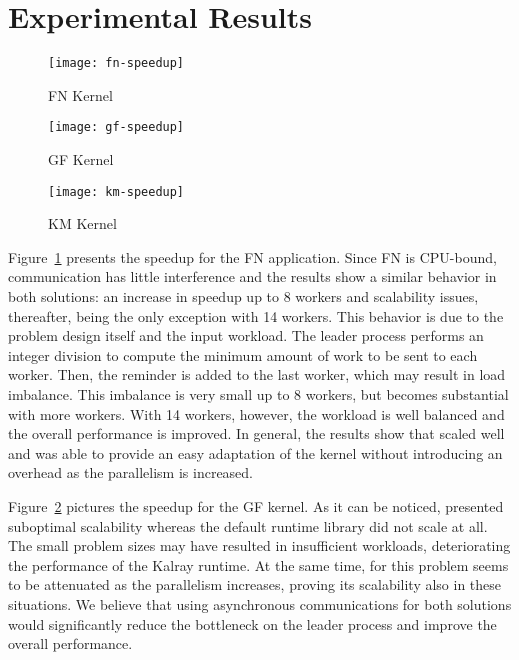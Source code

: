 \section{Experimental Results}
\label{sec:experimental-results}
	
	\begin{figure}[t]
		\centering
		\texttt{[image: fn-speedup]}
		\caption{FN Kernel}
		\label{figure:fn}
		\vspace{-15pt}
	\end{figure}

	\begin{figure}[b]
		\centering
		\vspace{-15pt}
		\texttt{[image: gf-speedup]}
		\caption{GF Kernel}
		\label{figure:gf}
	\end{figure}

	\begin{figure}[t]
		\centering
		\texttt{[image: km-speedup]}
		\caption{KM Kernel}
		\label{figure:km}
		\vspace{-15pt}
	\end{figure}

	Figure~\ref{figure:fn} presents the speedup for the FN application.
	Since FN is CPU-bound, communication has little interference and
	the results show a similar behavior in both solutions:
	an increase in speedup up to 8 workers and scalability issues, thereafter,
	being the only exception with 14 workers.
	This behavior is due to the problem design itself and the input workload.
	The leader process performs an integer division to compute the minimum amount
	of work to be sent to each worker. Then, the reminder is added to the last worker,
	which may result in load imbalance. This imbalance is very small up to 8 workers,
	but becomes substantial with more workers. With 14 workers, however, the workload
	is well balanced and the overall performance is improved.
	In general, the results show that \lwmpi scaled well and was able to provide an
	easy adaptation of the kernel without introducing an overhead as the parallelism is
	increased.

	Figure~\ref{figure:gf} pictures the speedup for the GF kernel.
	As it can be noticed, \lwmpi presented suboptimal scalability whereas
	the default runtime library did not scale at all.
	The small problem sizes may have resulted in insufficient workloads,
	deteriorating the performance of the Kalray runtime.
	At the same time, for \lwmpi this problem seems to be attenuated as
	the parallelism increases, proving its scalability also in these
	situations.
	We believe that using asynchronous communications for both
	solutions would significantly reduce the bottleneck on the leader process
	and improve the overall performance.

